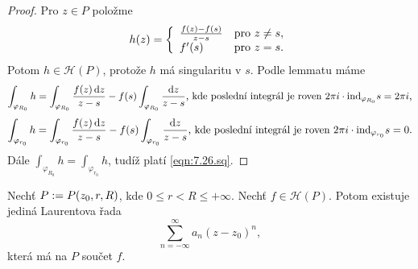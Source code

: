 \begin{proof}
Pro $z \in P$ položme 
\begin{equation*}
    h(z)=\left\{ \begin{array}{ll} \frac{f(z)-f(s)}{z-s} & \mbox{pro } z \neq s, \\ f'(s) & \mbox{pro } z=s. \end{array} \right.
\end{equation*}
Potom $h \in \mathcal{H}(P)$, protože $h$ má  singularitu v $s$. Podle lemmatu máme
$$
\int_{\varphi_{R_0}}h=\int_{\varphi_{R_0}}\frac{f(z) \mathop{}\!\mathrm{d} z}{z-s}-f(s) \int_{\varphi_{R_0}}\frac{\mathop{}\!\mathrm{d} z}{z-s}\text{, kde poslední integrál je roven }2\pi i \cdot \text{ind}_{\varphi_{R_0}}s=2 \pi i\text{,}
$$
$$
\int_{\varphi_{r_0}}h=\int_{\varphi_{r_0}}\frac{f(z) \mathop{}\!\mathrm{d} z}{z-s}-f(s) \int_{\varphi_{r_0}}\frac{\mathop{}\!\mathrm{d} z}{z-s}\text{, kde poslední integrál je roven }2\pi i \cdot \text{ind}_{\varphi_{r_0}}s=0{.}
$$
Dále $\int_{\varphi_{R_0}}h=\int_{\varphi_{r_0}}h$, tudíž platí \cref{eqn:7.26.sq}.
\end{proof}

\begin{theorem}
Nechť $P:= \\ P(z_0,r,R)$, kde $0\leq r < R \leq + \infty$. Nechť $f \in \mathcal{H}(P)$. Potom existuje jediná Laurentova řada 
\begin{equation}
    \sum\limits_{n=-\infty}^{\infty} a_n(z-z_0)^n,  
    \tag{L}
    \label{eqn:7.27.lau}
\end{equation}
která má na $P$ součet $f$.
\end{theorem}

